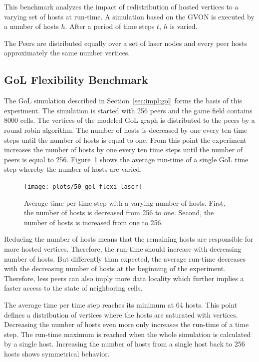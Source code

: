 This benchmark analyzes the impact of redistribution of hosted
vertices to a varying set of hosts at run-time. A simulation based on the
GVON is executed by a number of hosts $h$. After a period of time steps
$t$, $h$ is varied.

The Peers are distributed equally over a set of laser nodes and
every peer hosts approximately the same number vertices.

\subsection{GoL Flexibility Benchmark}

The GoL simulation described in Section~\ref{sec:impl:gol} forms the
basis of this experiment.  The simulation is started with 256 peers
and the game field contains 8000 cells. The vertices of the modeled
GoL graph is distributed to the peers by a round robin algorithm.  The
number of hosts is decreased by one every ten time steps until the
number of hosts is equal to one. From this point the experiment
increases the number of hosts by one every ten time steps until the
number of peers is equal to 256. Figure~\ref{fig:gol_flexi_laser}
shows the average run-time of a single GoL time step whereby the
number of hosts are varied.

\begin{figure}[H]
  \texttt{[image: plots/50\_gol\_flexi\_laser]}
  \caption{Average time per time step with a varying number of
    hosts. First, the number of hosts is decreased from 256 to
    one. Second, the number of hosts is increased from one to 256.}
  \label{fig:gol_flexi_laser}
\end{figure}

\noindent Reducing the number of hosts means that the remaining hosts are
responsible for more hosted vertices. Therefore, the run-time should increase
with decreasing number of hosts.  But differently than expected, the
average run-time decreases with the decreasing number of hosts at the
beginning of the experiment. Therefore, less peers can also imply more
data locality which further implies a faster access to the state of
neighboring cells.

The average time per time step reaches its minimum at 64 hosts. This
point defines a distribution of vertices where the hosts are saturated
with vertices.  Decreasing the number of hosts even more only
increases the run-time of a time step. The run-time maximum is reached
when the whole simulation is calculated by a single host.  Increasing
the number of hosts from a single host back to 256 hosts shows
symmetrical behavior.




\cleardoublepage

